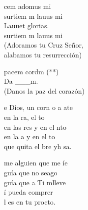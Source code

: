 \documentclass[12pt]{article}
\begin{document}
\begin{multicols*}{2}
\begin{cancion}%
	cem adomus mi\\
	surtiem m lauus mi \\
	Lauuet glorias.\\
	surtiem m lauus mi\\
(Adoramos tu Cruz Señor,\\
 alabamos tu resurrección)\\
\end{cancion}%

\begin{cancion}%
	pacem cordm (**)\\
	Da ___m.\\
(Danos la paz del corazón)\\
\end{cancion}%

\begin{cancion}%
	e Dios, un corn o a ate \\
	en la ra, el to\\
	en las res y en el nto\\
	en la a y en el to\\
	que quita el bre yh sa.\\
\end{cancion}%

\begin{cancion}%
	me alguien que me íe\\
	guía que no seago\\
	guía que a Ti mlleve\\
	í pueda comprer\\
	l es en  tu procto. \\
\end{cancion}%


\end{multicols*}
\end{document}
